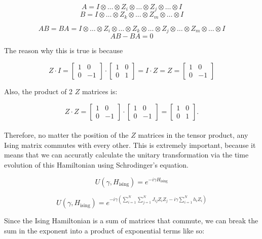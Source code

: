 \documentclass[12pt,a4paper]{report}
\begin{document}
\[
A = I \otimes \ldots \otimes Z_i \otimes \ldots \otimes Z_j \otimes \ldots \otimes I
\]
\[
B = I \otimes \ldots \otimes Z_k \otimes \ldots \otimes Z_m \otimes \ldots \otimes I
\]

\[
A B = B A = I \otimes \ldots \otimes Z_i \otimes \ldots \otimes Z_k \otimes \ldots \otimes Z_j \otimes \ldots \otimes Z_m \otimes \ldots \otimes I
\]
\[
AB - BA = 0
\]

\noindent
The reason why this is true is because 

\[
Z \cdot I = 
\begin{bmatrix}
1 & 0 \\
0 & -1 
\end{bmatrix} 
\cdot 
\begin{bmatrix}
1 & 0 \\
0 & 1 
\end{bmatrix} 
= I \cdot Z = Z = 
\begin{bmatrix}
1 & 0 \\
0 & -1 
\end{bmatrix}
\]

\noindent
Also, the product of 2 $Z$ matrices is:

\[
Z \cdot Z = 
\begin{bmatrix}
1 & 0 \\
0 & -1 
\end{bmatrix} 
\cdot 
\begin{bmatrix}
1 & 0 \\
0 & -1 
\end{bmatrix} 
= 
\begin{bmatrix}
1 & 0 \\
0 & 1 
\end{bmatrix}.
\]
\\

\noindent
Therefore, no matter the position of the $Z$ matrices in the tensor product, any Ising matrix commutes with every other. This is extremely important, because it means that we can accuratly calculate the unitary transformation via the time evolution of this Hamiltonian using Schrodinger's equation.

\newpage

\[
U(\gamma, H_{\text{ising}}) = e^{-i\gamma H_{\text{ising}}}
\]

\[
U(\gamma, H_{\text{ising}}) = e^{-i\gamma\left(\sum_{i=1}^{N} \sum_{j=1}^{N} J_{ij} Z_i Z_j -i\gamma \sum_{i=1}^{N} h_i Z_i\right)}
\]

\noindent
Since the Ising Hamiltonian is a sum of matrices that commute, we can break the sum in the exponent into a product of exponential terms like so:
\end{document}
